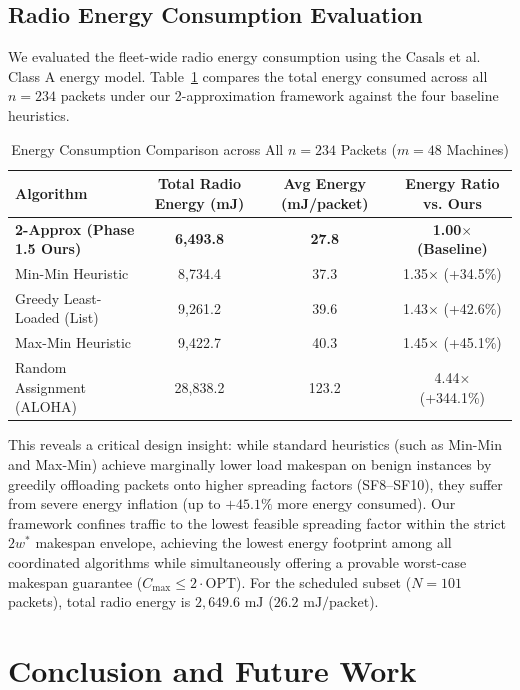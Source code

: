 \documentclass{article}
\begin{document}
\subsection{Radio Energy Consumption Evaluation}
\label{subsec:energy_evaluation}
We evaluated the fleet-wide radio energy consumption using the Casals et al.~\cite{casals2017modeling} Class A energy model. Table~\ref{tab:energy_comparison} compares the total energy consumed across all $n = 234$ packets under our 2-approximation framework against the four baseline heuristics.

\begin{table}[!ht]
\centering
\small
\caption{Energy Consumption Comparison across All $n=234$ Packets ($m=48$ Machines)}
\label{tab:energy_comparison}
\begin{tabular}{|l|c|c|c|}
\hline
\textbf{Algorithm} & \textbf{Total Radio Energy (mJ)} & \textbf{Avg Energy (mJ/packet)} & \textbf{Energy Ratio vs. Ours} \\
\hline
\hline
\textbf{2-Approx (Phase 1.5 Ours)} & \textbf{6,493.8} & \textbf{27.8} & \textbf{1.00$\times$ (Baseline)} \\
\hline
Min-Min Heuristic & 8,734.4 & 37.3 & 1.35$\times$ (+34.5\%) \\
\hline
Greedy Least-Loaded (List) & 9,261.2 & 39.6 & 1.43$\times$ (+42.6\%) \\
\hline
Max-Min Heuristic & 9,422.7 & 40.3 & 1.45$\times$ (+45.1\%) \\
\hline
Random Assignment (ALOHA) & 28,838.2 & 123.2 & 4.44$\times$ (+344.1\%) \\
\hline
\end{tabular}
\end{table}

This reveals a critical design insight: while standard heuristics (such as Min-Min and Max-Min) achieve marginally lower load makespan on benign instances by greedily offloading packets onto higher spreading factors (SF8--SF10), they suffer from severe energy inflation (up to $+45.1\%$ more energy consumed). Our framework confines traffic to the lowest feasible spreading factor within the strict $2 w^*$ makespan envelope, achieving the lowest energy footprint among all coordinated algorithms while simultaneously offering a provable worst-case makespan guarantee ($C_{\max} \le 2 \cdot \text{OPT}$). For the scheduled subset ($N = 101$ packets), total radio energy is $2,649.6\text{ mJ}$ ($26.2\text{ mJ/packet}$).

\section{Conclusion and Future Work}
\label{sec:conclusion}
\end{document}
